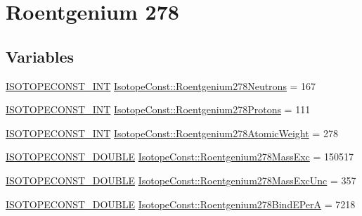 \hypertarget{group___isotope_const-_roentgenium-_rg278}{}\section{Roentgenium 278}
\label{group___isotope_const-_roentgenium-_rg278}
\subsection*{Variables}
\begin{DoxyCompactItemize}
\item 
\mbox{\hyperlink{group___isotope_const-_macros_ga5f18360b3e99483a35c32d789e62621c}{I\+S\+O\+T\+O\+P\+E\+C\+O\+N\+S\+T\+\_\+\+I\+NT}} \mbox{\hyperlink{group___isotope_const-_roentgenium-_rg278_ga4334a548a7a6bab22680be2939f1e089}{Isotope\+Const\+::\+Roentgenium278\+Neutrons}} = 167
\item 
\mbox{\hyperlink{group___isotope_const-_macros_ga5f18360b3e99483a35c32d789e62621c}{I\+S\+O\+T\+O\+P\+E\+C\+O\+N\+S\+T\+\_\+\+I\+NT}} \mbox{\hyperlink{group___isotope_const-_roentgenium-_rg278_ga454dd4adfc3c8517be2b254ea65e2295}{Isotope\+Const\+::\+Roentgenium278\+Protons}} = 111
\item 
\mbox{\hyperlink{group___isotope_const-_macros_ga5f18360b3e99483a35c32d789e62621c}{I\+S\+O\+T\+O\+P\+E\+C\+O\+N\+S\+T\+\_\+\+I\+NT}} \mbox{\hyperlink{group___isotope_const-_roentgenium-_rg278_ga450fa08d41155e8f1bc1a51912fa9b0b}{Isotope\+Const\+::\+Roentgenium278\+Atomic\+Weight}} = 278
\item 
\mbox{\hyperlink{group___isotope_const-_macros_ga8f45a7272ce02c0b4c65c44636ed719a}{I\+S\+O\+T\+O\+P\+E\+C\+O\+N\+S\+T\+\_\+\+D\+O\+U\+B\+LE}} \mbox{\hyperlink{group___isotope_const-_roentgenium-_rg278_gae5a155d04b3be74bdd838bf601e10ade}{Isotope\+Const\+::\+Roentgenium278\+Mass\+Exc}} = 150517
\item 
\mbox{\hyperlink{group___isotope_const-_macros_ga8f45a7272ce02c0b4c65c44636ed719a}{I\+S\+O\+T\+O\+P\+E\+C\+O\+N\+S\+T\+\_\+\+D\+O\+U\+B\+LE}} \mbox{\hyperlink{group___isotope_const-_roentgenium-_rg278_ga77c393783f5aa787c71a1b779ff9989f}{Isotope\+Const\+::\+Roentgenium278\+Mass\+Exc\+Unc}} = 357
\item 
\mbox{\hyperlink{group___isotope_const-_macros_ga8f45a7272ce02c0b4c65c44636ed719a}{I\+S\+O\+T\+O\+P\+E\+C\+O\+N\+S\+T\+\_\+\+D\+O\+U\+B\+LE}} \mbox{\hyperlink{group___isotope_const-_roentgenium-_rg278_gae20d0a64ee32c129d4573fe91f743e0e}{Isotope\+Const\+::\+Roentgenium278\+Bind\+E\+PerA}} = 7218

\end{DoxyCompactItemize}
